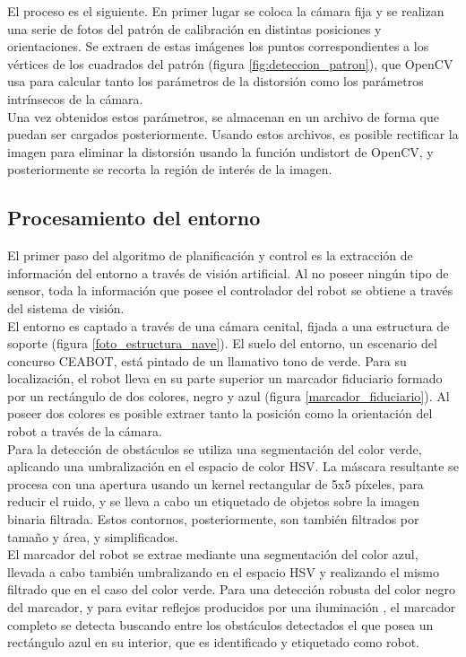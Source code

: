 El proceso es el siguiente. En primer lugar se coloca la cámara fija y se realizan una serie de fotos del patrón de calibración en distintas posiciones y orientaciones. Se extraen de estas imágenes los puntos correspondientes a los vértices de los cuadrados del patrón (figura \ref{fig:deteccion_patron}), que OpenCV usa para calcular tanto los parámetros de la distorsión como los parámetros intrínsecos de la cámara.\\

Una vez obtenidos estos parámetros, se almacenan en un archivo de forma que puedan ser cargados posteriormente. Usando estos archivos, es posible rectificar la imagen para eliminar la distorsión usando la función undistort de OpenCV, y posteriormente se recorta la región de interés de la imagen.



\subsection{Procesamiento del entorno}
\label{procesamiento}

El primer paso del algoritmo de planificación y control es la extracción de información del entorno a través de visión artificial. Al no poseer ningún tipo de sensor, toda la información que posee el controlador del robot se obtiene a través del sistema de visión.\\

El entorno es captado a través de una cámara cenital, fijada a una estructura de soporte (figura \ref{foto_estructura_nave}). El suelo del entorno, un escenario del concurso CEABOT, está pintado de un llamativo tono de verde. Para su localización, el robot lleva en su parte superior un marcador fiduciario formado por un rectángulo de dos colores, negro y azul (figura \ref{marcador_fiduciario}). Al poseer dos colores es posible extraer tanto la posición como la orientación del robot a través de la cámara.\\

Para la detección de obstáculos se utiliza una segmentación del color verde, aplicando una umbralización en el espacio de color HSV. La máscara resultante se procesa con una apertura usando un kernel rectangular de 5x5 píxeles, para reducir el ruido, y se lleva a cabo un etiquetado de objetos sobre la imagen binaria filtrada. Estos contornos, posteriormente, son también filtrados por tamaño y área, y simplificados.\\

El marcador del robot se extrae mediante una segmentación del color azul, llevada a cabo también umbralizando en el espacio HSV y realizando el mismo filtrado que en el caso del color verde. Para una detección robusta del color negro del marcador, y para evitar reflejos producidos por una iluminación , el marcador completo se detecta buscando entre los obstáculos detectados el que posea un rectángulo azul en su interior, que es identificado y etiquetado como robot.\\ 

